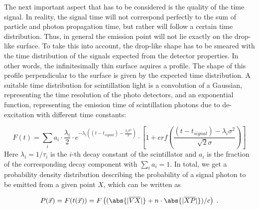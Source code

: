   The next important aspect that has to be considered is the quality of the time signal. In reality, the signal time will not correspond
  perfectly to the sum of particle and photon propagation time, but rather will follow a certain time distribution. Thus, in general 
  the emission point will not lie exactly on the drop-like surface. To take this into account, the drop-like shape has to be smeared 
  with the time distribution of the signals expected from the detector properties. In other words, the infinitesimally thin 
  surface aquires a profile. The shape of this profile perpendicular to the surface is given by the expected
  time distribution. A suitable time distribution for scintillation light is a convolution of a Gaussian, representing the time resolution of the photo 
  detectors, and an exponential function, representing the emission time of scintillation photons due to de-excitation with different 
  time constants:
  
  \begin{equation}
  \label{Eq:ScintillationTimeProfile}
   F(t) = \sum_{i} a_i \cdot \frac{\lambda_i}{2} \cdot e^{-\lambda_i ((t - t_{signal}) - \frac{\lambda_i \sigma^2}{2})} \cdot \left[ 1 + erf(\frac{(t - t_{signal})- \lambda_i \sigma^2}{\sqrt{2} \sigma}) \right]
  \end{equation}
  Here $\lambda_i = 1/\tau_i$ is the $i$-th decay constant of the scintillator and $a_i$ is the fraction of the corresponding decay 
  component with $\sum_{i} a_i = 1$. In total, we get a probability density distribution describing the probability 
  of a signal photon to be emitted from a given point $X$, which can be written as
  
  
  \begin{equation}
    \label{Eq:Raw_prob_density}
    P(\vec{x}) = F(t(\vec{x})) = F\left( (\abs{|\overline{VX}|} + n \cdot \abs{|\overline{XP}|})/c \right) \; .
  \end{equation}
  
